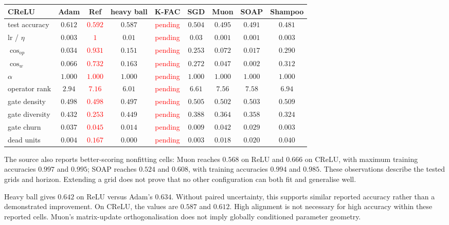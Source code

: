 \documentclass{article}
\newcommand{\nat}[1]{\textcolor{red}{#1}}
\theoremstyle{definition}
\theoremstyle{remark}
\begin{document}
\begin{center}\small
\begin{adjustbox}{max width=\linewidth}
\begin{tabular}{lcccccccc}
\toprule
CReLU & Adam & Ref & heavy ball & K-FAC & SGD & Muon & SOAP & Shampoo \\
\midrule
test accuracy & $\mathbf{0.612}$ & \nat{$0.592$} & $0.587$ & \nat{pending} & $0.504$ & $0.495$ & $0.491$ & $0.481$ \\
lr / $\eta$ & $0.003$ & \nat{$1$} & $0.01$ & \nat{pending} & $0.03$ & $0.001$ & $0.001$ & $0.003$ \\
\midrule
$\cos_{op}$ & $0.034$ & \nat{$\mathbf{0.931}$} & $0.151$ & \nat{pending} & $0.253$ & $0.072$ & $0.017$ & $0.290$ \\
$\cos_w$ & $0.066$ & \nat{$\mathbf{0.732}$} & $0.163$ & \nat{pending} & $0.272$ & $0.047$ & $0.002$ & $0.312$ \\
$\alpha$ & $1.000$ & \nat{$1.000$} & $1.000$ & \nat{pending} & $1.000$ & $1.000$ & $1.000$ & $1.000$ \\
operator rank & $\mathbf{2.94}$ & \nat{$7.16$} & $6.01$ & \nat{pending} & $6.61$ & $7.56$ & $7.58$ & $6.94$ \\
gate density & $0.498$ & \nat{$0.498$} & $0.497$ & \nat{pending} & $0.505$ & $0.502$ & $0.503$ & $0.509$ \\
gate diversity & $0.432$ & \nat{$0.253$} & $0.449$ & \nat{pending} & $0.388$ & $0.364$ & $0.358$ & $0.324$ \\
gate churn & $0.037$ & \nat{$0.045$} & $0.014$ & \nat{pending} & $0.009$ & $0.042$ & $0.029$ & $0.003$ \\
dead units & $0.004$ & \nat{$0.167$} & $0.000$ & \nat{pending} & $0.003$ & $0.018$ & $0.020$ & $0.040$ \\
\bottomrule
\end{tabular}
\end{adjustbox}
\end{center}

The source also reports better-scoring nonfitting cells: Muon reaches $0.568$ on ReLU and $0.666$ on CReLU, with maximum training accuracies $0.997$ and $0.995$; SOAP reaches $0.524$ and $0.608$, with training accuracies $0.994$ and $0.985$. These observations describe the tested grids and horizon. Extending a grid does not prove that no other configuration can both fit and generalise well.

Heavy ball gives $0.642$ on ReLU versus Adam's $0.634$. Without paired uncertainty, this supports similar reported accuracy rather than a demonstrated improvement. On CReLU, the values are $0.587$ and $0.612$. High alignment is not necessary for high accuracy within these reported cells. Muon's matrix-update orthogonalisation does not imply globally conditioned parameter geometry.
\end{document}
